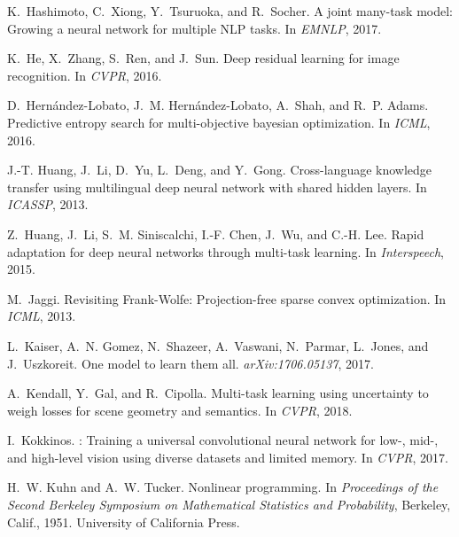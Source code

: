 \documentclass{article}
\begin{document}
{\begin{thebibliography}{60}
K.~Hashimoto, C.~Xiong, Y.~Tsuruoka, and R.~Socher.
\newblock A joint many-task model: Growing a neural network for multiple {NLP}
  tasks.
\newblock In \emph{EMNLP}, 2017.

K.~He, X.~Zhang, S.~Ren, and J.~Sun.
\newblock Deep residual learning for image recognition.
\newblock In \emph{{CVPR}}, 2016.

D.~Hern{\'{a}}ndez{-}Lobato, J.~M. Hern{\'{a}}ndez{-}Lobato, A.~Shah, and R.~P.
  Adams.
\newblock Predictive entropy search for multi-objective bayesian optimization.
\newblock In \emph{{ICML}}, 2016.

J.-T. Huang, J.~Li, D.~Yu, L.~Deng, and Y.~Gong.
\newblock Cross-language knowledge transfer using multilingual deep neural
  network with shared hidden layers.
\newblock In \emph{ICASSP}, 2013.

Z.~Huang, J.~Li, S.~M. Siniscalchi, I.-F. Chen, J.~Wu, and C.-H. Lee.
\newblock Rapid adaptation for deep neural networks through multi-task
  learning.
\newblock In \emph{Interspeech}, 2015.

M.~Jaggi.
\newblock Revisiting {Frank-Wolfe}: Projection-free sparse convex optimization.
\newblock In \emph{{ICML}}, 2013.

L.~Kaiser, A.~N. Gomez, N.~Shazeer, A.~Vaswani, N.~Parmar, L.~Jones, and
  J.~Uszkoreit.
\newblock One model to learn them all.
\newblock \emph{arXiv:1706.05137}, 2017.

A.~Kendall, Y.~Gal, and R.~Cipolla.
\newblock Multi-task learning using uncertainty to weigh losses for scene
  geometry and semantics.
\newblock In \emph{{CVPR}}, 2018.

I.~Kokkinos.
: Training a universal convolutional neural network for
  low-, mid-, and high-level vision using diverse datasets and limited memory.
\newblock In \emph{CVPR}, 2017.

H.~W. Kuhn and A.~W. Tucker.
\newblock Nonlinear programming.
\newblock In \emph{Proceedings of the Second Berkeley Symposium on Mathematical
  Statistics and Probability}, Berkeley, Calif., 1951. University of California
  Press.


\end{thebibliography}}
\end{document}
